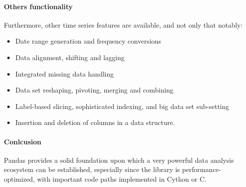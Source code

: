 \paragraph{Others functionality}
Furthermore, other time series features are available, and not only that notably:
\begin{itemize}
    \item Date range generation and frequency conversions
    \item Data alignment, shifting and lagging
    \item Integrated missing data handling
    \item Data set reshaping, pivoting, merging and combining
    \item Label-based slicing, sophisticated indexing, and big data set sub-setting
    \item Insertion and deletion of columns in a data structure.
\end{itemize}
\paragraph{Conlcusion}
Pandas provides a solid foundation upon which a very powerful data analysis ecosystem can be established, especially since the library is performance-optimized, with important code paths implemented in Cython or C.